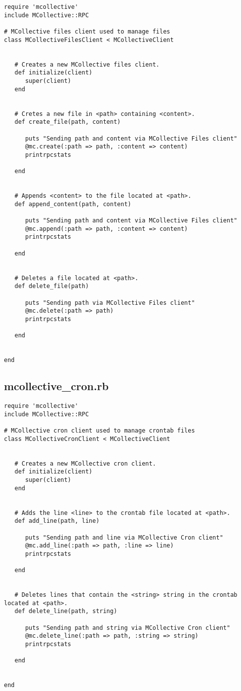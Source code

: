 \begin{lstlisting}
require 'mcollective'
include MCollective::RPC

# MCollective files client used to manage files
class MCollectiveFilesClient < MCollectiveClient
   
   
   # Creates a new MCollective files client.
   def initialize(client)
      super(client)
   end
   
   
   # Cretes a new file in <path> containing <content>.
   def create_file(path, content)
   
      puts "Sending path and content via MCollective Files client"
      @mc.create(:path => path, :content => content)
      printrpcstats
   
   end
   
   
   # Appends <content> to the file located at <path>.
   def append_content(path, content)
   
      puts "Sending path and content via MCollective Files client"
      @mc.append(:path => path, :content => content)
      printrpcstats
   
   end
   
   
   # Deletes a file located at <path>.
   def delete_file(path)
   
      puts "Sending path via MCollective Files client"
      @mc.delete(:path => path)
      printrpcstats
   
   end
   
   
end
\end{lstlisting}


\subsection{mcollective\_cron.rb}


\begin{lstlisting}
require 'mcollective'
include MCollective::RPC

# MCollective cron client used to manage crontab files
class MCollectiveCronClient < MCollectiveClient
   
   
   # Creates a new MCollective cron client.
   def initialize(client)
      super(client)
   end
   
   
   # Adds the line <line> to the crontab file located at <path>.
   def add_line(path, line)
   
      puts "Sending path and line via MCollective Cron client"
      @mc.add_line(:path => path, :line => line)
      printrpcstats
   
   end
   
   
   # Deletes lines that contain the <string> string in the crontab located at <path>.
   def delete_line(path, string)
   
      puts "Sending path and string via MCollective Cron client"
      @mc.delete_line(:path => path, :string => string)
      printrpcstats
   
   end
   
   
end
\end{lstlisting}


